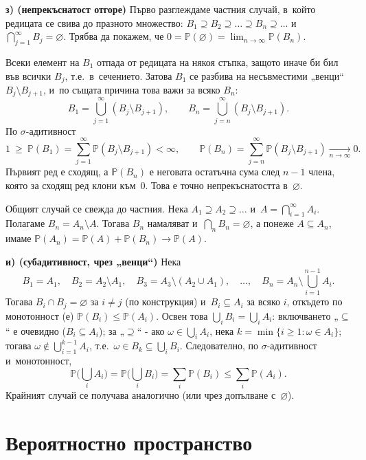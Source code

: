 \begin{proofbox}
\textbf{з) (непрекъснатост отгоре)} Първо разглеждаме частния случай,
в~който редицата се свива до празното множество: $B_1\supseteq
B_2\supseteq\dots\supseteq B_n\supseteq\dots$ и~$\bigcap_{j=1}^{\infty}
B_j=\varnothing$. Трябва да покажем, че
$0=\mathbb P(\varnothing)=\lim_{n\to\infty}\mathbb P(B_n)$.

Всеки елемент на $B_1$ отпада от редицата на някоя стъпка, защото
иначе би бил във всички $B_j$, т.е.\ в~сечението. Затова $B_1$ се
разбива на несъвместими „венци“ $B_j\setminus B_{j+1}$, и~по същата
причина това важи за всяко $B_n$:
\[
  B_1=\bigcup_{j=1}^{\infty}(B_j\setminus B_{j+1}),
  \qquad
  B_n=\bigcup_{j=n}^{\infty}(B_j\setminus B_{j+1}).
\]
По $\sigma$-адитивност
\[
  1\ \ge\ \mathbb P(B_1)=\sum_{j=1}^{\infty}\mathbb P(B_j\setminus B_{j+1})<\infty,
  \qquad
  \mathbb P(B_n)=\sum_{j=n}^{\infty}\mathbb P(B_j\setminus B_{j+1})
  \xrightarrow[n\to\infty]{}0.
\]
Първият ред е сходящ, а $\mathbb P(B_n)$ е неговата остатъчна сума
след $n-1$ члена, която за сходящ ред клони към~$0$. Това е точно
непрекъснатостта в~$\varnothing$.

Общият случай се свежда до частния. Нека $A_1\supseteq A_2\supseteq
\dots$ и~$A=\bigcap_{i=1}^{\infty}A_i$. Полагаме $B_n=A_n\setminus A$.
Тогава $B_n$ намаляват и~$\bigcap_n B_n=\varnothing$, а понеже
$A\subseteq A_n$, имаме $\mathbb P(A_n)=\mathbb P(A)+\mathbb P(B_n)
\to\mathbb P(A)$.

\textbf{и) (субадитивност, чрез „венци“)} Нека
\[
  B_1=A_1,\quad B_2=A_2\setminus A_1,\quad B_3=A_3\setminus(A_2\cup A_1),\quad \dots,\quad B_n=A_n\setminus\bigcup_{i=1}^{n-1}A_i.
\]
Тогава $B_i\cap B_j=\varnothing$ за $i\neq j$ (по конструкция) и~$B_i\subseteq A_i$ за всяко $i$, откъдето по монотонност (е)
$\mathbb{P}(B_i)\leq\mathbb{P}(A_i)$. Освен това
$\bigcup_{i}B_i=\bigcup_i A_i$: включването „$\subseteq$“ е очевидно
($B_i\subseteq A_i$); за „$\supseteq$“ - ако $\omega\in\bigcup_i A_i$,
нека $k=\min\{i\geq 1:\omega\in A_i\}$; тогава $\omega\notin
\bigcup_{i=1}^{k-1}A_i$, т.е.\ $\omega\in B_k\subseteq\bigcup_i B_i$.
Следователно, по $\sigma$-адитивност и~монотонност,
\[
  \mathbb{P}\Big(\bigcup_{i}A_i\Big) = \mathbb{P}\Big(\bigcup_i B_i\Big) = \sum_i \mathbb{P}(B_i) \leq \sum_i \mathbb{P}(A_i).
\]
Крайният случай се получава аналогично (или чрез допълване с~$\varnothing$). \qedbg
\end{proofbox}

\section{Вероятностно пространство}

